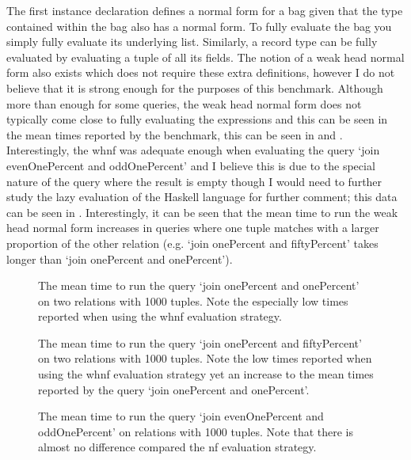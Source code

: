 \noindent
The first instance declaration defines a normal form for a bag given that the
type contained within the bag also has a normal form. To fully evaluate the bag
you simply fully evaluate its underlying list. Similarly, a record type can be
fully evaluated by evaluating a tuple of all its fields. The notion of a weak
head normal form also exists which does not require these extra definitions,
however I do not believe that it is strong enough for the purposes of this
benchmark. Although more than enough for some queries, the weak head normal form
does not typically come close to fully evaluating the expressions and this can
be seen in the mean times reported by the benchmark, this can be seen in
and . Interestingly, the whnf was
adequate enough when evaluating the query `join evenOnePercent and
oddOnePercent' and I believe this is due to the special nature of the query
where the result is empty though I would need to further study the lazy
evaluation of the Haskell language for further comment; this data can be seen in
.
Interestingly, it can be seen that the mean time to run the weak head normal
form increases in queries where one tuple matches with a larger proportion of
the other relation (e.g. `join onePercent and fiftyPercent' takes longer than
`join onePercent and onePercent'). 

\begin{figure}[p]
    \centering
    
    \caption{The mean time to run the query `join onePercent and onePercent' on
    two relations with 1000 tuples. Note the especially low times reported when
using the whnf evaluation strategy.}
    \label{fig:evaluation:nf-whnf-join-onePercent-and-onePercent}
\end{figure}

\begin{figure}[p]
    \centering
    
    \caption{The mean time to run the query `join onePercent and fiftyPercent' on
    two relations with 1000 tuples. Note the low times reported when
using the whnf evaluation strategy yet an increase to the mean times reported by
the query `join onePercent and onePercent'.}
    \label{fig:evaluation:nf-whnf-join-onePercent-and-fiftyPercent}
\end{figure}

\begin{figure}[p]
    \centering
    
    \caption{The mean time to run the query `join evenOnePercent and oddOnePercent' on
    relations with 1000 tuples. Note that there is almost no difference compared
the nf evaluation strategy.}
    \label{fig:evaluation:nf-whnf-join-evenOnePercent-and-oddOnePercent}
\end{figure}
